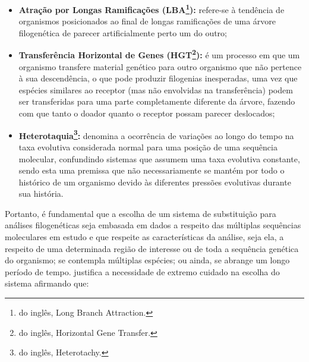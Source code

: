 \documentclass[english,brazilian]{UNISINOSmonografia} %
\begin{document}
\begin{itemize}
	
	\item \textbf{Atração por Longas Ramificações (LBA\footnote{do inglês, Long Branch Attraction.}):}
	refere-se à tendência de organismos posicionados ao final de longas ramificações de uma árvore filogenética de parecer artificialmente perto um do outro;
	
	\item \textbf{Transferência Horizontal de Genes (HGT\footnote{do inglês, Horizontal Gene Transfer.}):}
	é um processo em que um organismo transfere material genético para outro organismo que não pertence à sua descendência, o que pode produzir filogenias inesperadas, uma vez que espécies similares ao receptor (mas não envolvidas na transferência) podem ser transferidas para uma parte completamente diferente da árvore, fazendo com que tanto o doador quanto o receptor possam parecer deslocados;
	
	\item \textbf{Heterotaquia\footnote{do inglês, Heterotachy.}:} 
	denomina a ocorrência de variações ao longo do tempo na taxa evolutiva considerada normal para uma posição de uma sequência molecular, confundindo sistemas que assumem uma taxa evolutiva constante, sendo esta uma premissa que não necessariamente se mantém por todo o histórico de um organismo devido às diferentes pressões evolutivas durante sua história.

\end{itemize}


Portanto, é fundamental que a escolha de um sistema de substituição para análises filogenéticas seja embasada em dados a respeito das múltiplas sequências moleculares em estudo e que respeite as características da análise, seja ela, a respeito de uma determinada região de interesse ou de toda a sequência genética do organismo; se contempla múltiplas espécies; ou ainda, se abrange um longo período de tempo.
 justifica a necessidade de extremo cuidado na escolha do sistema afirmando que:
\end{document}
